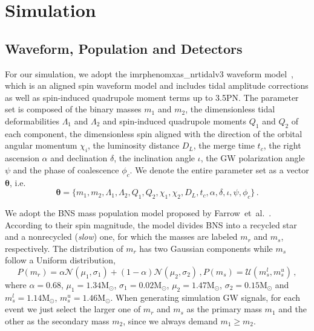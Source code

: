 \documentclass[a4paper,11pt]{article}
\begin{document}
\section{Simulation}
\label{sec3}

\subsection{Waveform, Population and Detectors}
\label{sec3_1}

For our simulation, we adopt the {\sc imrphenomxas\_nrtidalv3} waveform model~\cite{Abac:2023ujg}, which is an aligned spin waveform model and includes tidal amplitude corrections as well as spin-induced quadrupole moment terms up to 3.5PN. The parameter set is composed of the binary masses $m_1$ and $m_2$, the dimensionless tidal deformabilities $\Lambda_1$ and $\Lambda_2$ and spin-induced quadrupole moments $Q_1$ and $Q_2$ of each component, the dimensionless spin aligned with the direction of the orbital angular momentum $\chi_i$, the luminosity distance $D_L$, the merge time $t_c$, the right ascension $\alpha$ and declination $\delta$, the inclination angle $\iota$, the GW polarization angle $\psi$ and the phase of coalescence $\phi_c$. We denote the entire parameter set as a vector $\bm{\theta}$, i.e.
\begin{equation}
\label{parameter set}
\bm{\theta} = \{m_1,m_2,\Lambda_1,\Lambda_2,Q_1,Q_2,\chi_1,\chi_2,D_L,t_c,\alpha,\delta,\iota,\psi,\phi_c\}\,.
\end{equation}

We adopt the BNS mass population model proposed by Farrow~et~al.~\cite{Farrow:2019xnc}. According to their spin magnitude, the model divides BNS into a recycled star and a nonrecycled (\emph{slow}) one, for which the masses are labeled $m_r$ and $m_s$, respectively. The distribution of $m_r$ has two Gaussian components while $m_s$ follow a Uniform distribution,
\begin{subequations}
\label{mass population}
\begin{equation}
    P(m_r) = \alpha \mathcal{N}(\mu_1, \sigma_1) + (1-\alpha) \mathcal{N}(\mu_2, \sigma_2)\,,
\end{equation}
\begin{equation}
    P(m_s) = \mathcal{U}(m_s^l, m_s^u)\,,
\end{equation}
\end{subequations}
where $\alpha=0.68$, $\mu_1=1.34\mathrm{M}_{\odot}$, $\sigma_1=0.02\mathrm{M}_{\odot}$, $\mu_2=1.47\mathrm{M}_{\odot}$, $\sigma_2=0.15\mathrm{M}_{\odot}$ and $m_s^l=1.14\mathrm{M}_{\odot}$, $m_s^u=1.46\mathrm{M}_{\odot}$. When generating simulation GW signals, for each event we just select the larger one of $m_r$ and $m_s$ as the primary mass $m_1$ and the other as the secondary mass $m_2$, since we always demand $m_1 \geq m_2$.
\end{document}
